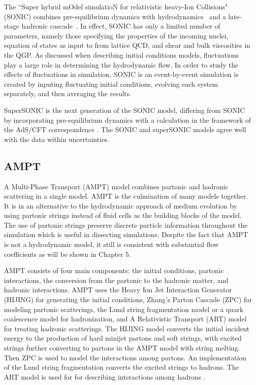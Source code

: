 The ``Super hybrid mOdel simulatioN for relativistic heavy-Ion Collisions" (SONIC) combines pre-equilibrium dynamics with hydrodynamics~\cite{PhysRevC.78.034915} and a late-stage hadronic cascade~\cite{PhysRevC.92.011901}. In effect, SONIC has only a limited number of parameters, namely those specifying the properties of the incoming nuclei, equation of states as input to from lattice QCD, and shear and bulk viscosities in the QGP. As discussed when describing initial conditions models, fluctuations play a large role in determining the hydrodynamic flow. In order to study the effects of fluctuations in simulation, SONIC is an event-by-event simulation is created by inputing fluctuating initial conditions, evolving each system separately, and then averaging the results.

SuperSONIC is the next generation of the SONIC model, differing from SONIC by incorporating pre-equilibrium dynamics with a calculation in the framework of the AdS/CFT correspondence \cite{Romatschke2015}. The SONIC and superSONIC models agree well with the data within uncertainties.
\subsection{AMPT}
A Multi-Phase Transport (AMPT) model combines partonic and hadronic scattering in a single model. AMPT is the culmination of many models together. It is in an alternative to the hydrodynamic approach of medium evolution by using partonic strings instead of fluid cells as the building blocks of the model. The use of partonic strings preserve discrete particle information throughout the simulation which is useful in dissecting simulations. Despite the fact that AMPT is not a hydrodynamic model, it still is consistent with substantial flow coefficients as will be shown in Chapter 5.

AMPT consists of four main components: the initial conditions, partonic interactions, the conversion from the partonic to the hadronic matter, and hadronic interactions. AMPT uses the Heavy Ion Jet Interaction Generator (HIJING) for generating the initial conditions, Zhang's Parton Cascade (ZPC) for modeling partonic scatterings, the Lund string fragmentation model or a quark coalescence model for hadronization, and A Relativistic Transport (ART) model for treating hadronic scatterings. The HIJING model converts the initial incident energy to the production of hard minijet partons and soft strings, with excited strings further converting to partons in the AMPT model with string melting. Then ZPC is used to model the interactions among partons. An implementation of the Lund string fragmentation converts the excited strings to hadrons. The ART model is used for for describing interactions among hadrons \cite{PhysRevC.72.064901}.

